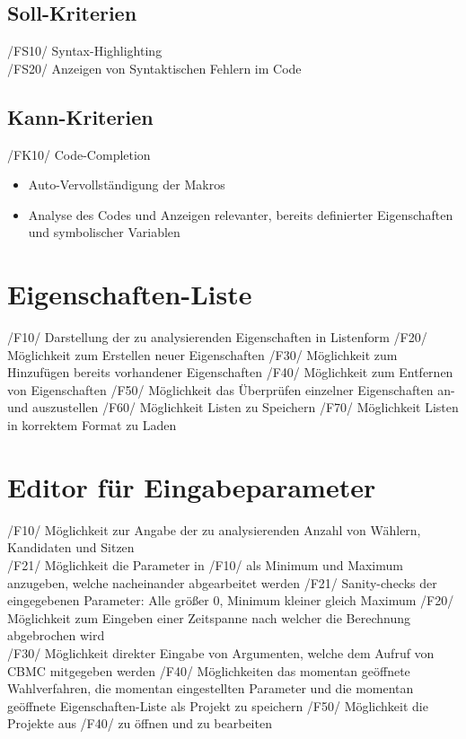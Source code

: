 \documentclass[a4paper]{scrreprt}
\begin{document}
\subsection{Soll-Kriterien}
/FS10/ Syntax-Highlighting \\
/FS20/ Anzeigen von Syntaktischen Fehlern im Code \\

\subsection{Kann-Kriterien}
/FK10/ Code-Completion
\begin{itemize}
\item Auto-Vervollständigung der Makros
\item Analyse des Codes und Anzeigen relevanter, bereits definierter Eigenschaften und symbolischer Variablen
\end{itemize}

\section{Eigenschaften-Liste}
/F10/ Darstellung der zu analysierenden Eigenschaften in Listenform
/F20/ Möglichkeit zum Erstellen neuer Eigenschaften
/F30/ Möglichkeit zum Hinzufügen bereits vorhandener Eigenschaften
/F40/ Möglichkeit zum Entfernen von Eigenschaften
/F50/ Möglichkeit das Überprüfen einzelner Eigenschaften an- und auszustellen
/F60/ Möglichkeit Listen zu Speichern 
/F70/ Möglichkeit Listen in korrektem Format zu Laden

\section{Editor für Eingabeparameter}
/F10/ Möglichkeit zur Angabe der zu analysierenden Anzahl von Wählern, Kandidaten und Sitzen \\
/F21/ Möglichkeit die Parameter in /F10/ als Minimum und Maximum anzugeben, welche nacheinander abgearbeitet werden
/F21/ Sanity-checks der eingegebenen Parameter: Alle größer 0, Minimum kleiner gleich Maximum 
/F20/ Möglichkeit zum Eingeben einer Zeitspanne nach welcher die Berechnung abgebrochen wird \\
/F30/ Möglichkeit direkter Eingabe von Argumenten, welche dem Aufruf von CBMC mitgegeben werden 
/F40/ Möglichkeiten das momentan geöffnete Wahlverfahren, die momentan eingestellten Parameter und die momentan geöffnete Eigenschaften-Liste als Projekt zu speichern
/F50/ Möglichkeit die Projekte aus /F40/ zu öffnen und zu bearbeiten
\end{document}
